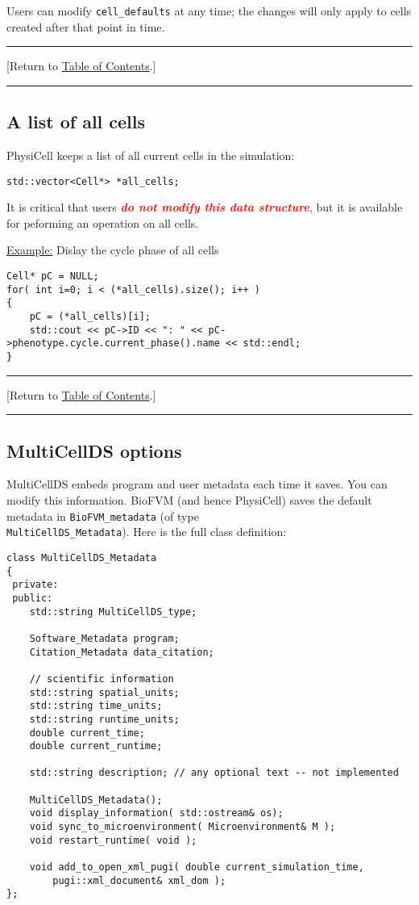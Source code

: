 \documentclass[12pt]{article}
\renewcommand{\v}{\verb}
\newcommand{\red}[1]{\textcolor{red}{#1}}
\newcommand{\blue}[1]{\textcolor{blue}{#1}}
\newcommand{\DONE}{}%
\newcommand{\TOClink}{\begin{center}\hrule\vskip-5pt\phantom{.}\hfill[Return to \hyperlink{TOC}{Table of Contents}.]\hfill\phantom{.}\vskip3pt\hrule\end{center}}
\begin{document}
Users can modify \v|cell_defaults| at any time; the changes will only 
apply to cells created after that point in time.  

\TOClink 

\subsection{A list of all cells}
\label{sec:All_Cells}
PhysiCell keeps a list of all current cells in the simulation: 

\begin{verbatim}
std::vector<Cell*> *all_cells;
\end{verbatim}

It is critical that users \emph{\red{\textbf{do not modify this data structure}}}, but it 
is available for peforming an operation on all cells. 

\underline{Example:} Dislay the cycle phase of all cells
\begin{verbatim}
Cell* pC = NULL; 
for( int i=0; i < (*all_cells).size(); i++ )
{
    pC = (*all_cells)[i]; 
    std::cout << pC->ID << ": " << pC->phenotype.cycle.current_phase().name << std::endl; 
}
\end{verbatim}

\TOClink 



\subsection{MultiCellDS options \DONE}
\label{sec:MultiCellDS_Options}
MultiCellDS embeds program and user metadata each time it saves. You can 
modify this information. BioFVM (and hence PhysiCell) saves the default 
metadata in \v|BioFVM_metadata| (of type \\
\v|MultiCellDS_Metadata|). Here is the full class definition: 
%
\begin{verbatim}
class MultiCellDS_Metadata
{
 private:
 public:
    std::string MultiCellDS_type; 

    Software_Metadata program; 
    Citation_Metadata data_citation; 

    // scientific information  
    std::string spatial_units; 
    std::string time_units;
    std::string runtime_units; 
    double current_time; 
    double current_runtime; 
    
    std::string description; // any optional text -- not implemented 

    MultiCellDS_Metadata();    
    void display_information( std::ostream& os); 
    void sync_to_microenvironment( Microenvironment& M );  
    void restart_runtime( void );  

    void add_to_open_xml_pugi( double current_simulation_time, 
        pugi::xml_document& xml_dom ); 
};
\end{verbatim}
\end{document}

